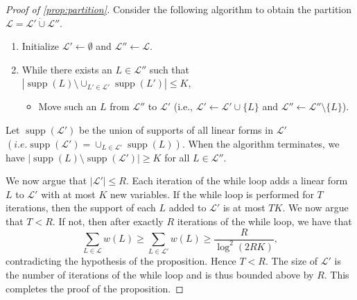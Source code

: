 \documentclass[10pt,a4paper]{article}
\theoremstyle{plain}
\theoremstyle{definition}
\newcommand{\disjunion}{\mathbin{\dot{\cup}}}
\newcommand{\union}{\mathbin{\cup}}
\newcommand{\supp}{\operatorname{supp}}
\newcommand{\calL}{{\mathcal{L}}}
\renewcommand{\calL}{\mathcal{L}}
\begin{document}
	\begin{proof}[Proof of {\cref{prop:partition}}]
	    Consider the following algorithm to obtain the partition
            $\calL = \calL'\disjunion \calL''$. 
	    \begin{enumerate}
		    \item Initialize $\calL' \gets \emptyset $ and
                      $\calL'' \gets \calL$.
		    \item While there exists an $L \in \calL''$ such
                      that $|\supp(L) \setminus \union_{L' \in \calL'}\supp(L')| \leq
                      K$, 
                      \begin{itemize}
                        \item Move such an $L$ from $\calL''$ to
                          $\calL'$ (i.e., $\calL' \gets \calL' \union
                          \{L\}$ and $\calL'' \gets \calL'' \setminus
                          \{L\}$).
                        \end{itemize}
                      \end{enumerate}
Let $\supp(\calL')$ be the union of supports of all linear forms in $\calL'$ $(i.e. \supp(\calL') = \cup_{L \in \calL'} \supp(L))$. 
When the algorithm terminates, we have $|\supp(L) \setminus
\supp(\calL')| \geq K$ for all $L \in \calL''$. 

We now argue that $|\calL'| \leq R$. Each iteration of the while loop adds a linear form $L$ to $\calL'$
with at most $K$ new variables. If the while loop is performed for $T$ iterations, then the support of each $L$ added to $\calL'$ is
at most $TK$. We now argue that $T < R$. If not, then after exactly $R$ iterations of the while loop, we have that
\[
\sum_{L \in \calL} w(L) \geq \sum_{L \in \calL'} w(L) \geq
\frac{R}{\log^2(2RK)},
\]
contradicting the hypothesis of the proposition. Hence $T < R$. The
size of $\calL'$ is the number of iterations of the while loop and is
thus bounded above by $R$. This completes the proof of the
proposition.
\end{proof}
\end{document}
